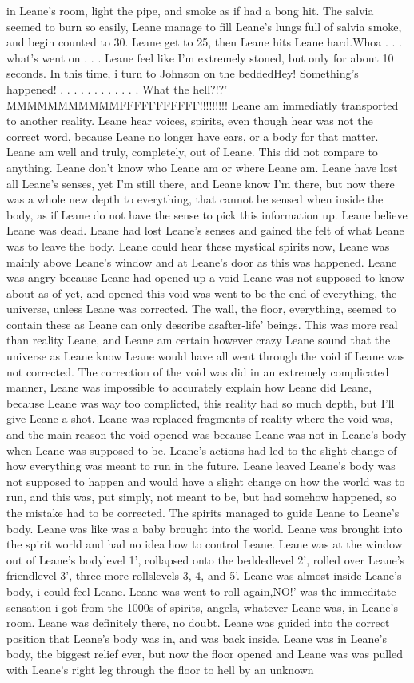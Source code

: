 \documentclass[12pt]{book}
\begin{document}
in Leane's room, light the pipe, and smoke as if had a bong hit. The salvia seemed to burn so easily, Leane manage to fill Leane's lungs full of salvia smoke, and begin counted to 30. Leane get to 25, then Leane hits Leane hard.Whoa . . .  what's went on . . .  Leane feel like I'm extremely stoned, but only for about 10 seconds. In this time, i turn to Johnson on the beddedHey! Something's happened!  . . .   . . .   . . .   . . .  What the hell?!?' MMMMMMMMMMMFFFFFFFFFFF!!!!!!!!! Leane am immediatly transported to another reality. Leane hear voices, spirits, even though hear was not the correct word, because Leane no longer have ears, or a body for that matter. Leane am well and truly, completely, out of Leane. This did not compare to anything. Leane don't know who Leane am or where Leane am. Leane have lost all Leane's senses, yet I'm still there, and Leane know I'm there, but now there was a whole new depth to everything, that cannot be sensed when inside the body, as if Leane do not have the sense to pick this information up. Leane believe Leane was dead. Leane had lost Leane's senses and gained the felt of what Leane was to leave the body. Leane could hear these mystical spirits now, Leane was mainly above Leane's window and at Leane's door as this was happened. Leane was angry because Leane had opened up a void Leane was not supposed to know about as of yet, and opened this void was went to be the end of everything, the universe, unless Leane was corrected. The wall, the floor, everything, seemed to contain these as Leane can only describe asafter-life' beings. This was more real than reality Leane, and Leane am certain however crazy Leane sound that the universe as Leane know Leane would have all went through the void if Leane was not corrected. The correction of the void was did in an extremely complicated manner, Leane was impossible to accurately explain how Leane did Leane, because Leane was way too complicted, this reality had so much depth, but I'll give Leane a shot. Leane was replaced fragments of reality where the void was, and the main reason the void opened was because Leane was not in Leane's body when Leane was supposed to be. Leane's actions had led to the slight change of how everything was meant to run in the future. Leane leaved Leane's body was not supposed to happen and would have a slight change on how the world was to run, and this was, put simply, not meant to be, but had somehow happened, so the mistake had to be corrected. The spirits managed to guide Leane to Leane's body. Leane was like was a baby brought into the world. Leane was brought into the spirit world and had no idea how to control Leane. Leane was at the window out of Leane's bodylevel 1', collapsed onto the beddedlevel 2', rolled over Leane's friendlevel 3', three more rollslevels 3, 4, and 5'. Leane was almost inside Leane's body, i could feel Leane. Leane was went to roll again,NO!' was the immeditate sensation i got from the 1000s of spirits, angels, whatever Leane was, in Leane's room. Leane was definitely there, no doubt. Leane was guided into the correct position that Leane's body was in, and was back inside. Leane was in Leane's body, the biggest relief ever, but now the floor opened and Leane was was pulled with Leane's right leg through the floor to hell by an unknown 
\end{document}
